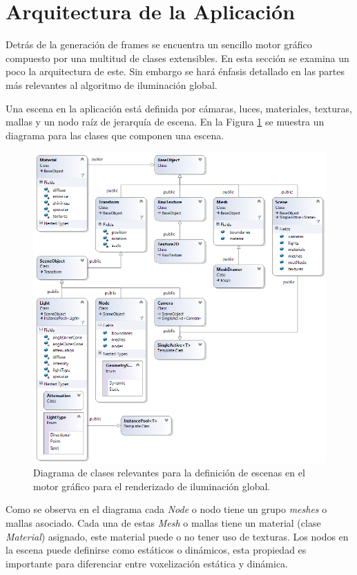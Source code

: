 \section{Arquitectura de la Aplicación} %
\label{sec:arquitectura_de_la_aplicacion}
Detrás de la generación de frames se encuentra un sencillo motor gráfico compuesto por una multitud de clases extensibles. En esta sección se examina un poco la arquitectura de este. Sin embargo se hará énfasis detallado en las partes más relevantes al algoritmo de iluminación global.

Una escena en la aplicación está definida por cámaras, luces, materiales, texturas, mallas y un nodo raíz de jerarquía de escena. En la Figura \ref{fig:scene_class_diagram} se muestra un diagrama para las clases que componen una escena.

\begin{figure}[H]
	\centering
	\captionsetup{justification=centering}
	\includegraphics[width=\linewidth]{media/ClassDiagram1.png}
	\caption{Diagrama de clases relevantes para la definición de escenas en el motor gráfico para el renderizado de iluminación global.}
	\label{fig:scene_class_diagram}
\end{figure}

Como se observa en el diagrama cada \emph{Node} o nodo tiene un grupo \emph{meshes} o mallas asociado. Cada una de estas \emph{Mesh} o mallas tiene un material (clase \emph{Material}) asignado, este material puede o no tener uso de texturas. Los nodos en la escena puede definirse como estáticos o dinámicos, esta propiedad es importante para diferenciar entre voxelización estática y dinámica.

